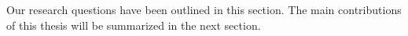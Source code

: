 Our research questions have been outlined in this section. The main contributions of this thesis will be summarized in the next section.










